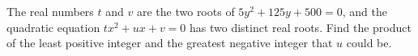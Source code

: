 The real numbers $t$ and $v$ are the two roots of $5y^2+125y+500=0$, and the quadratic equation $tx^2+ux+v=0$ has two distinct real roots. Find the product of the least positive integer and the greatest negative integer that $u$ could be.
